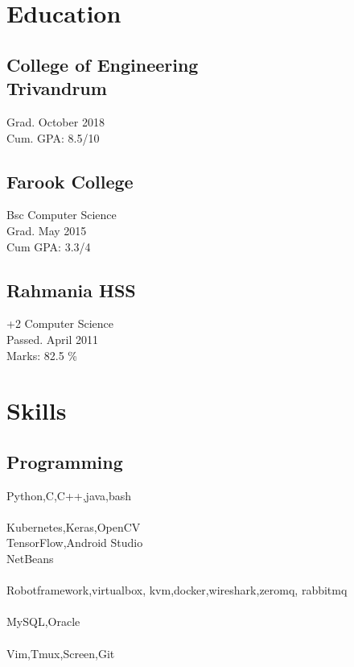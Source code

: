 \documentclass[11pt]{hieudo-build}
\begin{document}
\begin{minipage}[t]{0.34\textwidth} 

\section{Education} 
\subsection{College of Engineering \\ Trivandrum}                    
Grad. October 2018 \\                                               
Cum. GPA: 8.5/10\\                                                  
\sectionsep                                                         
\subsection{Farook College}  
Bsc Computer Science\\
Grad. May 2015 \\                                                   
Cum GPA: 3.3/4\\                                                    
\sectionsep     
\subsection{Rahmania HSS}
+2 Computer Science \\
Passed. April 2011 \\
Marks: 82.5 \%
\section{Skills}                                                    \subsection{Programming}                                          
Python,C,C++,java,bash\\~\\
Kubernetes,Keras,OpenCV\\                                           
TensorFlow,Android Studio\\
NetBeans \\~\\
Robotframework,virtualbox,
kvm,docker,wireshark,zeromq,
rabbitmq \\~\\
MySQL,Oracle \\~\\
Vim,Tmux,Screen,Git\\
 

\end{minipage}
\end{document}
